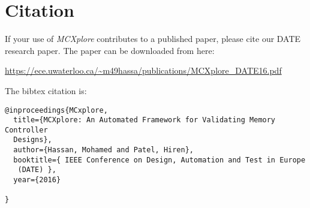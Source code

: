 \section{Citation} 
If your use of \textit{MCXplore} contributes to a published paper, please cite our  DATE research paper. 
The paper can be downloaded from here:

\url{https://ece.uwaterloo.ca/~m49hassa/publications/MCXplore_DATE16.pdf} 

The bibtex citation is: 

\begin{lstlisting}
@inproceedings{MCxplore,
  title={MCXplore: An Automated Framework for Validating Memory Controller 
  Designs},
  author={Hassan, Mohamed and Patel, Hiren},
  booktitle={ IEEE Conference on Design, Automation and Test in Europe
   (DATE) },
  year={2016}

}
\end{lstlisting}
